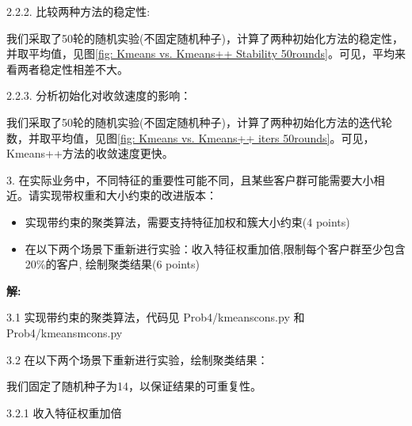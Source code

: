 \documentclass[8pt]{article}
\begin{document}
2.2.2. 比较两种方法的稳定性:

我们采取了50轮的随机实验(不固定随机种子)，计算了两种初始化方法的稳定性，并取平均值，见图\ref{fig: Kmeans vs. Kmeans++ Stability 50rounds}。可见，平均来看两者稳定性相差不大。

2.2.3. 分析初始化对收敛速度的影响：

我们采取了50轮的随机实验(不固定随机种子)，计算了两种初始化方法的迭代轮数，并取平均值，见图\ref{fig: Kmeans vs. Kmeans++ iters 50rounds}。可见，Kmeans++方法的收敛速度更快。

\vspace{3em}

3. 在实际业务中，不同特征的重要性可能不同，且某些客户群可能需要大小相近。请实现带权重和大小约束的改进版本：
\begin{itemize}
    \item 实现带约束的聚类算法，需要支持特征加权和簇大小约束(4 points)
    \item 在以下两个场景下重新进行实验：收入特征权重加倍,限制每个客户群至少包含20\%的客户, 绘制聚类结果(6 points)
\end{itemize}

\textbf{\large 解:}

3.1 实现带约束的聚类算法，代码见 {\color{blue}Prob4/kmeans\text{\_}cons.py} 和 {\color{blue}Prob4/kmeans\text{\_}mcons.py}

3.2 在以下两个场景下重新进行实验，绘制聚类结果：

我们固定了随机种子为14，以保证结果的可重复性。

3.2.1 收入特征权重加倍
\end{document}

